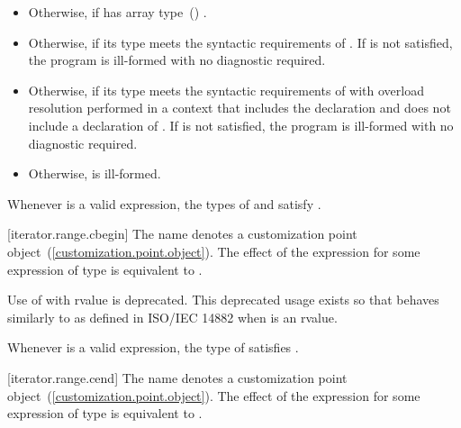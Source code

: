 \begin{addedblock}
\begin{itemize}
\item
  Otherwise,  if  has array
  type~() .

\item
  Otherwise,  if its type  meets the
  syntactic requirements of
  . If
   is not satisfied, the program is ill-formed with
  no diagnostic required.

\item
  Otherwise,  if its type  meets the
  syntactic requirements of
   with overload
  resolution performed in a context that includes the declaration
   and does not include
  a declaration of . If  is not
  satisfied, the program is ill-formed with no diagnostic required.

\item
  Otherwise,  is ill-formed.
\end{itemize}

\pnum
\remark Whenever  is a valid expression, the
types of  and  satisfy
.

[iterator.range.cbegin]{}
\pnum
The name  denotes a customization point
object~(\ref{customization.point.object}). The effect of the expression
 for some expression  of type 
is equivalent to .

\pnum
Use of  with rvalue  is deprecated.
\enternote This deprecated usage exists so that 
behaves similarly to  as defined in ISO/IEC 14882 when
 is an rvalue. \exitnote

\pnum
\enternote Whenever  is a valid expression, the
type of  satisfies . \exitnote

[iterator.range.cend]{}
\pnum
The name  denotes a customization point
object~(\ref{customization.point.object}). The effect of the expression
 for some expression  of type 
is equivalent to .


\end{addedblock}
